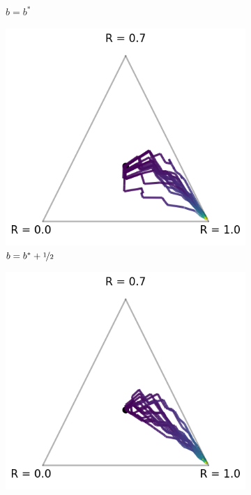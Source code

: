 \begin{figure}[!ht]
\begin{subfigure}[b]{0.245\linewidth}
    \caption{$b = b^\ast$}
  \end{subfigure}
  \begin{subfigure}[b]{0.245\linewidth}
    \includegraphics[width=\textwidth]{articles/baselines/figs/appendix_figs_3arm_000/vanilla_minvar_05.png}
    \caption{$b = b^\ast + \nicefrac{1}{2}$}
  \end{subfigure}
  \begin{subfigure}[b]{0.245\linewidth}
    \includegraphics[width=\textwidth]{articles/baselines/figs/appendix_figs_3arm_000/vanilla_value_00.png}

\end{subfigure}
\end{figure}
